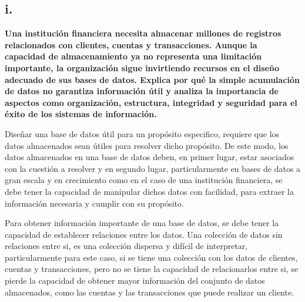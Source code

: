 \subsection*{i.}
\textbf{Una institución financiera necesita almacenar millones de registros relacionados con clientes, cuentas y transacciones. Aunque la capacidad de almacenamiento ya no representa una limitación importante, la organización sigue invirtiendo recursos en el diseño adecuado de sus bases de datos. Explica por qué la simple acumulación de datos no garantiza información útil y analiza la importancia de aspectos como organización, estructura, integridad y seguridad para el éxito de los sistemas de información.}

Diseñar una base de datos útil para un propósito especifico, requiere que los datos almacenados sean útiles para resolver dicho propósito. De este modo, los datos almacenados en una base de datos deben, en primer lugar, estar asociados con la cuestión a resolver y en segundo lugar, particularmente en bases de datos a gran escala y en crecimiento como en el caso de una institución financiera, se debe tener la capacidad de manipular dichos datos con facilidad, para extraer la información necesaria y cumplir con su propósito.

Para obtener información importante de una base de datos, se debe tener la capacidad de establecer relaciones entre los datos. Una colección de datos sin relaciones entre si, es una colección dispersa y difícil de interpretar, particularmente para este caso, si se tiene una colección con los datos de clientes, cuentas y transacciones, pero no se tiene la capacidad de relacionarlos entre si, se pierde la capacidad de obtener mayor información del conjunto de datos almacenados, como las cuentas y las transacciones que puede realizar un cliente.

